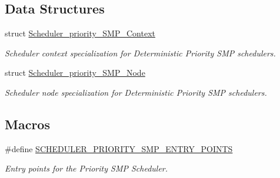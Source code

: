 \subsection*{Data Structures}
\begin{DoxyCompactItemize}
\item 
struct \mbox{\hyperlink{structScheduler__priority__SMP__Context}{Scheduler\+\_\+priority\+\_\+\+S\+M\+P\+\_\+\+Context}}
\begin{DoxyCompactList}\small\item\em Scheduler context specialization for Deterministic Priority S\+MP schedulers. \end{DoxyCompactList}\item 
struct \mbox{\hyperlink{structScheduler__priority__SMP__Node}{Scheduler\+\_\+priority\+\_\+\+S\+M\+P\+\_\+\+Node}}
\begin{DoxyCompactList}\small\item\em Scheduler node specialization for Deterministic Priority S\+MP schedulers. \end{DoxyCompactList}\end{DoxyCompactItemize}
\subsection*{Macros}
\begin{DoxyCompactItemize}
\item 
\#define \mbox{\hyperlink{group__RTEMSScoreSchedulerPrioritySMP_ga4e781e8e64d24700b589f6aaca8d6230}{S\+C\+H\+E\+D\+U\+L\+E\+R\+\_\+\+P\+R\+I\+O\+R\+I\+T\+Y\+\_\+\+S\+M\+P\+\_\+\+E\+N\+T\+R\+Y\+\_\+\+P\+O\+I\+N\+TS}}
\begin{DoxyCompactList}\small\item\em Entry points for the Priority S\+MP Scheduler. \end{DoxyCompactList}\end{DoxyCompactItemize}

